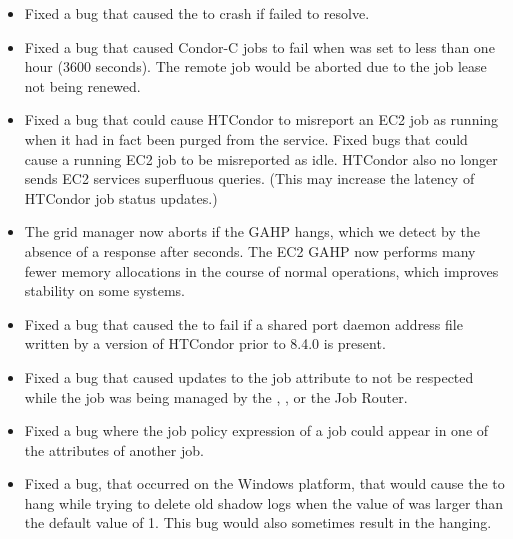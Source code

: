 \begin{itemize}

\item Fixed a bug that caused the  to crash if
 failed to resolve.

\item Fixed a bug that caused Condor-C jobs to fail when
 was set to less than one hour (3600 seconds).
The remote job would be aborted due to the job lease not being renewed.

\item Fixed a bug that could cause HTCondor to misreport an EC2 job as running
when it had in fact been purged from the service.  Fixed bugs that could
cause a running EC2 job to be misreported as idle.  HTCondor also no longer
sends EC2 services superfluous queries.  (This may increase the latency
of HTCondor job status updates.)

\item The grid manager now aborts if the GAHP hangs, which we detect by
the absence of a response after 
seconds.  The EC2 GAHP now performs many fewer memory allocations in the
course of normal operations, which improves stability on some systems.

\item Fixed a bug that caused the  to fail if a shared port
daemon address file written by a version of HTCondor prior to 8.4.0
is present.

\item Fixed a bug that caused updates to the job attribute
 to not be respected while the job was being managed
by the , , or the Job Router.

\item Fixed a bug where the job policy expression of a job could appear
in one of the  attributes of another job.

\item Fixed a bug, that occurred on the Windows platform, that would cause
the  to hang while trying to delete old shadow logs when the
value of  was larger than the default value of 1.
This bug would also sometimes result in the  hanging.

\end{itemize}

